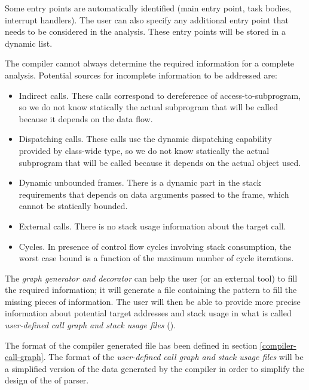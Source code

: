 Some entry points are automatically identified (main entry point, task
bodies, interrupt handlers). The user can also specify any additional
entry point that needs to be considered in the analysis. These entry
points will be stored in a dynamic list.

The compiler cannot always determine the required information for a
complete analysis. Potential sources for incomplete information to be
addressed are:

\begin{itemize}

\item Indirect calls. These calls correspond to dereference of
  access-to-subprogram, so we do not know statically the actual
  subprogram that will be called because it depends on the data flow.

\item Dispatching calls. These calls use the dynamic dispatching
  capability provided by class-wide type, so we do not know statically
  the actual subprogram that will be called because it depends on the
  actual object used.

\item Dynamic unbounded frames. There is a dynamic part in the stack
  requirements that depends on data arguments passed to the frame,
  which cannot be statically bounded.

\item External calls. There is no stack usage information about the
  target call.

\item Cycles. In presence of control flow cycles involving stack
  consumption, the worst case bound is a function of the maximum
  number of cycle iterations.

\end{itemize}

The \emph{graph generator and decorator} can help the user (or an
external tool) to fill the required information; it will generate a
file containing the pattern to fill the missing pieces of
information. The user will then be able to provide more precise
information about potential target addresses and stack usage in what
is called \emph{user-defined call graph and stack usage files}
().

The format of the compiler generated file has been defined in section
\ref{compiler-call-graph}. The format of the \emph{user-defined
  call graph and stack usage files} will be a simplified version of
the data generated by the compiler in order to simplify the design of
the of parser.

